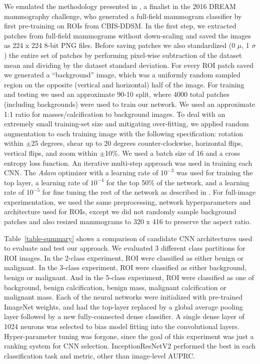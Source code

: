 \documentclass[journal]{IEEEtran}
\begin{document}
We emulated the methodology presented in \cite{shen-2017}, a finalist in the 2016 DREAM mammography challenge, who generated a full-field mammogram classifier by first pre-training on ROIs from CBIS-DDSM.  
In the first step, we extracted patches from full-field mammograms without down-scaling and saved the images as 224 x 224 8-bit PNG files. 
Before saving patches we also standardized (0 $\mu$, 1 $\sigma$) the entire set of patches by performing pixel-wise subtraction of the dataset mean and dividing by the dataset standard deviation.  
For every ROI patch saved we generated a ``background'' image, which was a uniformly random sampled region on the opposite (vertical and horizontal) half of the image.  For training and testing we used an approximate 90-10 split, where 4000 total patches (including backgrounds) were used to train our network.  
We used an approximate 1:1 ratio for masses/calcification to background images.  To deal with an extremely small training-set size and mitigating over-fitting, we applied random augmentation to each training image with the following specification: rotation within $\pm$25 degrees, shear up to 20 degrees counter-clockwise,  horizontal flips, vertical flips, and zoom within $\pm$10\%.  We used a batch size of 16 and a cross entropy loss function. 
An iterative multi-step approach was used in training each CNN.  The \textit{Adam} optimizer with a learning rate of $10^{-3}$ was used for training the top layer, a learning rate of $10^{-4}$ for the top 50\% of the network, and a learning rate of $10^{-5}$ for fine tuning the rest of the network as described in \cite{yi-2017, levy-2016, shen-2017}.  For full-image experimentation, we used the same preprocessing, network hyperparameters and architecture used for ROIs, except we did not randomly sample background patches and also resized mammograms to 320 x 416 to preserve the aspect ratio.  

Table~\ref{table-summary} shows a comparison of candidate CNN architectures used to evaluate and test our approach.  We evaluated 3 different class partitions for ROI images.  In the 2-class experiment, ROI were classified as either benign or malignant. In the 3-class experiment, ROI were classified as either background, benign or malignant.  And in the 5-class experiment, ROI were classified as one of background, benign calcification, benign mass, malignant calcification or malignant mass.  Each of the neural networks were initialized with pre-trained ImageNet weights, and had the top-layer replaced by a global average pooling layer followed by a new fully-connected dense classifier. A single dense layer of 1024 neurons was selected to bias model fitting into the convolutional layers. Hyper-parameter tuning was forgone, since the goal of this experiment was just a ranking system for CNN selection. InceptionResNetV2 performed the best in each classification task and metric, other than image-level AUPRC.
\end{document}
